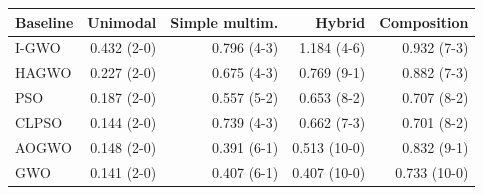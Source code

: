 \begin{tabular}{lrrrr}
\toprule
Baseline & Unimodal & Simple multim. & Hybrid & Composition\\
\midrule
I-GWO & 0.432 (2-0) & 0.796 (4-3) & 1.184 (4-6) & 0.932 (7-3) \\
HAGWO & 0.227 (2-0) & 0.675 (4-3) & 0.769 (9-1) & 0.882 (7-3) \\
PSO & 0.187 (2-0) & 0.557 (5-2) & 0.653 (8-2) & 0.707 (8-2) \\
CLPSO & 0.144 (2-0) & 0.739 (4-3) & 0.662 (7-3) & 0.701 (8-2) \\
AOGWO & 0.148 (2-0) & 0.391 (6-1) & 0.513 (10-0) & 0.832 (9-1) \\
GWO & 0.141 (2-0) & 0.407 (6-1) & 0.407 (10-0) & 0.733 (10-0) \\
\bottomrule
\end{tabular}

